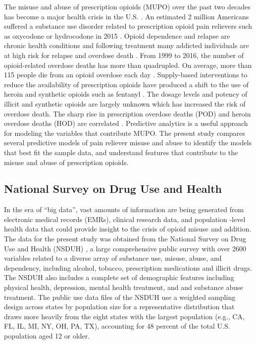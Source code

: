 \documentclass[sigconf]{acmart}
\begin{document}
The misuse and abuse of prescription opioids (MUPO) over the past two 
decades has become a major health crisis in the U.S. \cite{volkow14}. 
An estimated 2 million Americans suffered a substance use disorder related 
to prescription opioid pain relievers such as oxycodone or hydrocodone 
in 2015 \cite{nida18}. Opioid dependence and relapse are chronic health 
conditions and following treatment many addicted individuals are at high 
risk for relapse and overdose death \cite{shaham03}. From 1999 to 2016, 
the number of opioid-related overdose deaths has more than quadrupled. 
On average, more than 115 people die from an opioid overdose each day 
\cite{cdc18, judd16}. Supply-based interventions to reduce the availability 
of prescription opioids have produced a shift to the use of heroin and 
synthetic opioids such as fentanyl \cite{jones15}. The dosage levels and 
potency of illicit and synthetic opioids are largely unknown which has
increased the risk of overdose death. The sharp rise in prescription 
overdose deaths (POD) and heroin overdose deaths (HOD) are correlated 
\cite{muhuri13, unick13}. Predictive analytics is a useful approach for 
modeling the variables that contribute MUPO. The present study compares 
several predictive models of pain reliever misuse and abuse to identify 
the models that best fit the sample data, and understand features that 
contribute to the misuse and abuse of prescription opioids.  


\subsection{National Survey on Drug Use and Health} 

In the era of ``big data'', vast amounts of information are being generated 
from electronic medical records (EMRs), clinical research data, and population
-level health data \cite{hay13, herland14} that could provide insight to the
crisis of opioid misuse and addition. The data for the present study was 
obtained from the National Survey on Drug Use and Health (NSDUH) 
\cite{samhsa18}, a large comprehensive public survey with over 2600 variables
related to a diverse array of substance use, misuse, abuse, and dependency,  
including alcohol, tobacco, prescription medications and illicit drugs. 
The NSDUH also includes a complete set of demographic features including
physical health, depression, mental health treatment, and and substance 
abuse treatment. The public use data files of the NSDUH use a weighted 
sampling design across states by population size for a representative 
distribution that draws more heavily from the eight states with the largest 
population (e.g., CA, FL, IL, MI, NY, OH, PA, TX), accounting for 48 percent 
of the total U.S. population aged 12 or older. 
\end{document}
